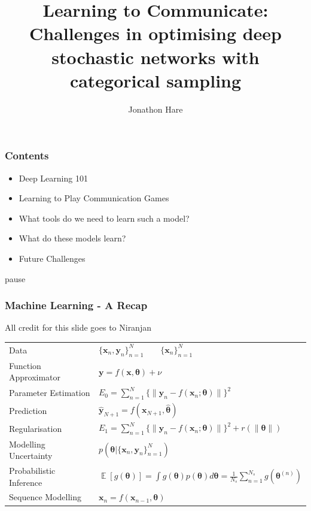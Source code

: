 \documentclass[\beamerclass,aspectratio=1610]{beamer}
\title[Learning to Communicate]{Learning to Communicate: Challenges in optimising deep stochastic networks with categorical sampling}
\author{Jonathon Hare}
\institute[]
{
  Vision, Learning and Control\\
  University of Southampton 
}
\date{}
\begin{document}

\begin{frame}
\frametitle{Contents}
\begin{itemize}
	\item Deep Learning 101
	\item Learning to Play Communication Games
	\item What tools do we need to learn such a model?
	\item What do these models learn?
	\item Future Challenges
\end{itemize}
\end{frame}

\begin{frame}{pause}
\frametitle{Machine Learning - A Recap}
{\tiny All credit for this slide goes to Niranjan}\\
\vspace{5mm}
\begin{tabular}{ll}
Data & $\{\bm{x}_n, \bm{y}_n\}^N_{n=1} \qquad \{\bm{x}_n\}^N_{n=1}$ 
\vspace{3mm} \\ 
Function Approximator & $\bm{y} = f (\bm{x}, \bm{\theta}) + \nu$ 
\vspace{3mm} \\ 
Parameter Estimation & $E_0 = \sum^N_{n=1} \{\|\bm{y}_n - f (\bm{x}_n; \bm{\theta})\|\}^2$
\vspace{3mm} \\ 
Prediction & $\bm{\hat y}_{N+1} = f(\bm{x}_{N+1}, \bm{\hat \theta})$
\vspace{3mm} \\ 
Regularisation & $E_1 = \sum^N_{n=1} \{\|\bm{y}_n - f (\bm{x}_n; \bm{\theta})\|\}^2 + r(\|\bm\theta\|)$
\vspace{3mm} \\ 
Modelling Uncertainty & $p(\bm\theta|\{\bm x_n, \bm y_n\}_{n=1}^N)$
\vspace{3mm} \\ 
Probabilistic Inference & $\mathop{\mathbb{E}}[g(\bm\theta)] = \int g(\bm\theta)p(\bm\theta)d\bm\theta = \frac{1}{N_s}\sum_{n=1}^{N_s}g(\bm\theta^{(n)})$
\vspace{3mm} \\ 
Sequence Modelling & $\bm x_n = f(\bm x_{n-1}, \bm\theta)$
\end{tabular}
\vspace{5mm}
\end{frame}
\end{document}
